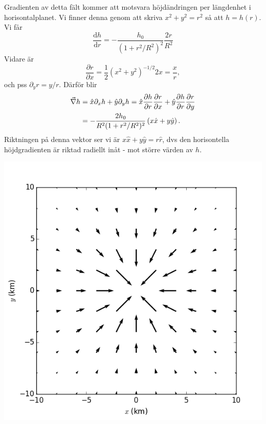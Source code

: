 \documentclass[%
oneside,                 %
final,                   %
10pt]{article}
\begin{document}
\vspace{6mm}



Gradienten av detta fält kommer att motsvara höjdändringen per längdenhet i horisontalplanet. Vi finner denna genom att skriva $x^2 + y^2 = r^2$ så att $h=h(r)$. Vi får
\begin{equation}
\frac{\mbox{d}h}{\mbox{d}r} = - \frac{h_0}{(1+r^2/R^2)^2} \frac{2r}{R^2}
\end{equation}
Vidare är 
\begin{equation}
\frac{\partial r}{\partial x} = \frac{1}{2} (x^2 + y^2)^{-1/2} 2 x = \frac{x}{r},
\end{equation}
och pss $\partial_y r = y/r$. Därför blir
\begin{align}
\vec{\nabla} h &= \hat{x} \partial_x h + \hat{y} \partial_y h 
= \hat{x} \frac{\partial h}{\partial r} \frac{\partial r}{\partial x}
+ \hat{y} \frac{\partial h}{\partial r} \frac{\partial r}{\partial y} \\ 
&= - \frac{2h_0}{R^2 (1+r^2/R^2)^2} \left( x \hat{x} + y \hat{y} \right).
\end{align}
Riktningen på denna vektor ser vi är $x\hat{x} + y\hat{y} = r\hat{r}$, dvs den horisontella höjdgradienten är riktad radiellt inåt - mot större värden av $h$.




\vspace{6mm}

\centerline{\includegraphics[width=0.8\linewidth]{fig/hojd_gradient.png}}
\end{document}

